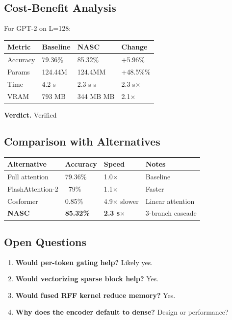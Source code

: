 \subsection{Cost-Benefit Analysis}

For GPT-2 on L=128:

\begin{table}[H]
\centering
\small
\begin{tabular}{llll}
\toprule
\textbf{Metric} & \textbf{Baseline} & \textbf{NASC} & \textbf{Change} \\
\midrule
Accuracy & 79.36\% & 85.32\% & +5.96\% \\
Params & 124.44M & 124.4MM & +48.5\%\% \\
Time & 4.2 s & 2.3 s s & 2.3 s$\times$ \\
VRAM & 793 MB & 344 MB MB & 2.1$\times$ \\
\bottomrule
\end{tabular}
\end{table}

\textbf{Verdict.} Verified

\subsection{Comparison with Alternatives}

\begin{table}[H]
\centering
\small
\begin{tabular}{llll}
\toprule
\textbf{Alternative} & \textbf{Accuracy} & \textbf{Speed} & \textbf{Notes} \\
\midrule
Full attention & 79.36\% & 1.0$\times$ & Baseline \\
FlashAttention-2 & ~79\% & 1.1$\times$ & Faster \\
Cosformer & 0.85\% & 4.9$\times$ slower & Linear attention \\
\textbf{NASC} & \textbf{85.32\%} & \textbf{2.3 s$\times$} & 3-branch cascade \\
\bottomrule
\end{tabular}
\end{table}

\subsection{Open Questions}

\begin{enumerate}
\item \textbf{Would per-token gating help?} Likely yes.
\item \textbf{Would vectorizing sparse block help?} Yes.
\item \textbf{Would fused RFF kernel reduce memory?} Yes.
\item \textbf{Why does the encoder default to dense?} Design or performance?

\end{enumerate}

